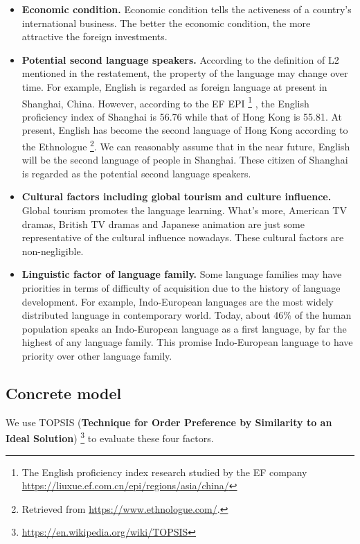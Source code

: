 \documentclass{mcmthesis}
\begin{document}
\begin{itemize}
  \item \textbf{Economic condition.} Economic condition tells the activeness of a country's international business. The better the economic condition, the more attractive the foreign investments.
  \item \textbf{Potential second language speakers.} According to the definition of L2 mentioned in the restatement, the property of the language may change over time. For example, English is regarded as foreign language at present in Shanghai, China. However, according to the EF EPI \footnote{The English proficiency index research studied by the EF company \url{https://liuxue.ef.com.cn/epi/regions/asia/china/} } , the English proficiency index of Shanghai is 56.76 while that of Hong Kong is 55.81. At present, English has become the second language of Hong Kong according to the Ethnologue  \footnote{Retrieved from \url{https://www.ethnologue.com/}.}.  We can reasonably assume that in the near future, English will be the second language of people in Shanghai. These citizen of Shanghai is regarded as the potential second language speakers.
  \item \textbf{Cultural factors including global tourism and culture influence.} Global tourism promotes the language learning. What's more, American TV dramas, British TV dramas and Japanese animation are just some representative of the cultural influence nowadays. These cultural factors are non-negligible.
  \item \textbf{Linguistic factor of language family.} Some language families may have priorities in terms of difficulty of acquisition due to the history of language development. For example, Indo-European languages are the most widely distributed language in contemporary world. Today, about 46\% of the human population speaks an Indo-European language as a first language, by far the highest of any language family. This promise Indo-European language to have priority over other language family.
\end{itemize}

\subsection{Concrete model}

We use TOPSIS (\textbf{Technique for Order Preference by Similarity to an Ideal Solution}) \footnote{ \url{https://en.wikipedia.org/wiki/TOPSIS}}  to evaluate these four factors.
\end{document}
